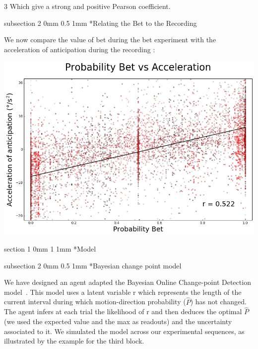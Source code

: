 \documentclass[profile,final,english, draft]{sciposter}%
\makeatletter
\renewcommand{\section}{\@startsection
        {section}%
        {1}%
        {0mm}%
        {1\baselineskip}%
        {1mm}%
        {\large\color{red}\bfseries}}%
\renewcommand{\subsection}{\@startsection
        {subsection}%
        {2}%
        {0mm}%
        {0.5\baselineskip}%
        {1mm}%
        {\normalsize\color[rgb]{0.4,0,0}\bfseries}}%
\makeatother
\begin{document}
\begin{multicols}{3}
Which give a strong and positive Pearson coefficient.

\subsection*{Relating the Bet to the Recording}

We now compare the value of bet during the bet experiment with the acceleration of anticipation during the recording :


\begin{center} 
    \includegraphics[width=1\columnwidth]{p_bet--v_a}
\end{center}

\columnbreak

\section*{Model}

\subsection*{Bayesian change point model}

We have designed an agent adapted the Bayesian Online Change-point Detection model~\parencite{AdamsMackay2007}. This model uses a latent variable r which represents the length of the current interval during which motion-direction probability ($\hat{P}$) has not changed. The agent infers at each trial the likelihood  of r and then deduces the optimal $\hat{P}$ (we used the expected value and the max as readouts) and the uncertainty associated to it. We simulated the model across our experimental sequences, as illustrated by the example for the third block.



\end{multicols}
\end{document}
